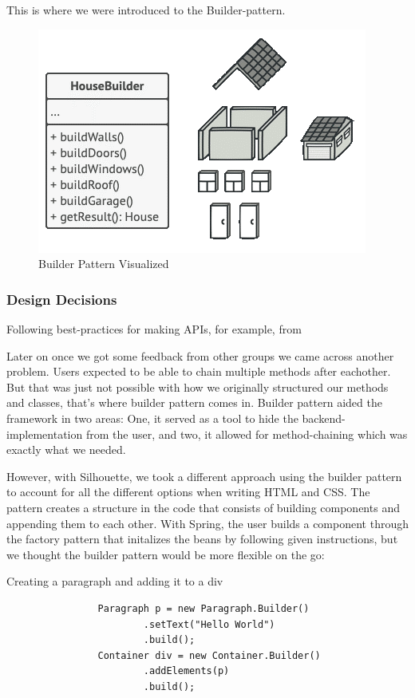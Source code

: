 \documentclass[12pt]{article}
\begin{document}
    This is where we were introduced to the Builder-pattern.

    \begin{figure}[H]
        \centering
        \includegraphics[scale=0.5]{images/builderPattern.png}
        \caption{Builder Pattern Visualized}
    \end{figure}
    
        \subsubsection{Design Decisions}
        Following best-practices for making APIs, for example, from     

        Later on once we got some feedback from other groups we came across another problem. Users expected to be able to chain multiple methods after eachother. But that was just not possible with how we originally structured our methods and classes, that's where builder pattern comes in. Builder pattern aided the framework in two areas: One, it served as a tool to hide the backend-implementation from the user, and two, it allowed for method-chaining which was exactly what we needed.

        However, with Silhouette, we took a different approach using the builder pattern to account for all the different options when writing HTML and CSS. The pattern creates a structure in the code that consists of building components and appending them to each other. With Spring, the user builds a component through the factory pattern that initalizes the beans by following given instructions, but we thought the builder pattern would be more flexible on the go:

        \begin{shaded}
            Creating a paragraph and adding it to a div
            \begin{lstlisting}
                Paragraph p = new Paragraph.Builder()
                        .setText("Hello World")
                        .build();
                Container div = new Container.Builder()
                        .addElements(p)
                        .build();
            \end{lstlisting}
        \end{shaded}
\end{document}
